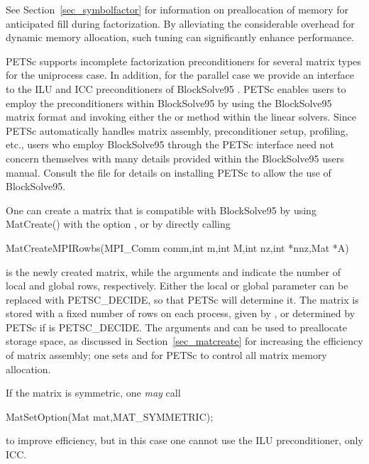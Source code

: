 See Section~\ref{sec_symbolfactor} for information on preallocation
of memory for anticipated fill during factorization.
By alleviating the considerable overhead for dynamic memory allocation,
such tuning can significantly enhance performance.

\label{sec_blocksolve}
PETSc supports incomplete factorization preconditioners for several matrix
types for the uniprocess case.  
 In addition, for the parallel case
we provide an interface to the ILU and ICC preconditioners
of BlockSolve95 \cite{bs-user-ref}.   PETSc enables users
to employ the preconditioners within
BlockSolve95 by using the BlockSolve95 matrix format 
and invoking either the  or  method within the linear
solvers.  Since PETSc automatically handles matrix assembly,
preconditioner setup, profiling, etc., users who employ BlockSolve95
through the PETSc interface need not concern themselves with many
details provided within the BlockSolve95 users manual. Consult the file
 for details on installing PETSc to allow 
the use of BlockSolve95.

One can create a matrix that is compatible with BlockSolve95 by using
MatCreate() with the option , or by directly
calling 
\begin{tabbing}
  MatCreateMPIRowbs(MPI\_Comm comm,int m,int M,int nz,int *nnz,Mat *A)
\end{tabbing}
 is the newly created matrix, while the arguments  and
 indicate the number of local and global rows,
respectively. Either the local or global parameter can be replaced
with PETSC\_DECIDE, so that PETSc will determine it.  The matrix
is stored with a fixed number of rows on each process, given by , or determined by PETSc if  is PETSC\_DECIDE.  The
arguments  and  can be used to preallocate storage
space, as discussed in Section~\ref{sec_matcreate} for increasing
the efficiency of matrix assembly; one sets  and
 for PETSc to control all matrix memory
allocation.  

If the matrix is symmetric, one {\em may} call
\begin{tabbing}
  MatSetOption(Mat mat,MAT\_SYMMETRIC);
\end{tabbing}
to improve efficiency, but in this case one cannot use the ILU 
preconditioner, only ICC.

